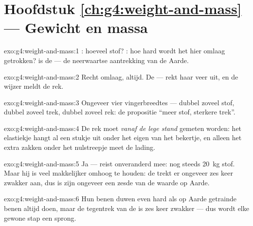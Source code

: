 \section*{Hoofdstuk \ref{ch:g4:weight-and-mass} --- Gewicht en massa}

\begin{solution}{exo:g4:weight-and-mass:1}
: hoeveel stof? : hoe hard wordt het hier omlaag
getrokken?  is de  --- de neerwaartse aantrekking van
de Aarde.
\end{solution}

\begin{solution}{exo:g4:weight-and-mass:2}
Recht omlaag, altijd. De  ---  rekt haar veer uit,
en de wijzer meldt de rek.
\end{solution}

\begin{solution}{exo:g4:weight-and-mass:3}
Ongeveer vier vingerbreedtes --- dubbel zoveel stof, dubbel zoveel
trek, dubbel zoveel rek: de propositie ``meer stof, sterkere trek''.
\end{solution}

\begin{solution}{exo:g4:weight-and-mass:4}
De rek moet \emph{vanaf de lege stand} gemeten worden: het elastiekje
hangt al een stukje uit onder het eigen  van het bekertje, en
alleen het extra zakken onder het nulstreepje meet de lading.
\end{solution}

\begin{solution}{exo:g4:weight-and-mass:5}
Ja ---  reist onveranderd mee: nog steeds \qty{20}{kg} stof. Maar
hij is veel makkelijker omhoog te houden: de  trekt er ongeveer
zes keer zwakker aan, dus is zijn  ongeveer een zesde van de
waarde op Aarde.
\end{solution}

\begin{solution}{exo:g4:weight-and-mass:6}
Hun benen duwen even hard als op Aarde getrainde benen altijd doen,
maar de tegentrek van de  is zes keer zwakker --- dus wordt elke
gewone stap een sprong.
\end{solution}

